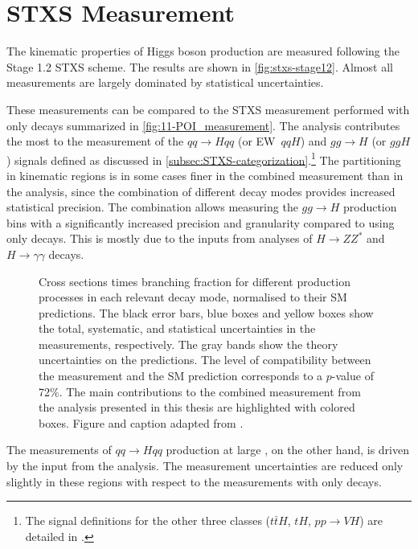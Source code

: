 \section{STXS Measurement}
The kinematic properties of Higgs boson production are measured following the Stage 1.2 STXS scheme. 
The results are shown in \cref{fig:stxs-stage12}. 
Almost all measurements are largely dominated by statistical uncertainties. 

These measurements can be compared to the STXS measurement performed with only \HWW decays summarized in \cref{fig:11-POI_measurement}. 
The \HWW analysis contributes the most to the measurement of the $qq\to Hqq$ (or EW~$qqH$) and $gg \to H$ (or $ggH$) signals defined as discussed in \cref{subsec:STXS-categorization}.\footnote{The signal definitions for the other three classes ($t\bar{t}H$, $tH$, $pp\to VH$) are detailed in .}
The partitioning in kinematic regions is in some cases finer in the combined measurement than in the \HWW analysis, since the combination of different decay modes provides increased statistical precision.
The combination allows measuring the $gg \to H$ production bins with a significantly increased precision and granularity compared to using only \HWW decays. 
This is mostly due to the inputs from analyses of $H \to ZZ^*$ and $H \to \gamma\gamma$ decays.
\begin{figure}[h!]
  \caption[Higgs boson cross sections times branching fraction for different production processes in each relevant decay mode.]{Cross sections times branching fraction for different production processes in each relevant decay mode, normalised to their SM predictions. The black error bars, blue boxes and yellow boxes show the total, systematic, and statistical uncertainties in the measurements, respectively. The gray bands show the theory uncertainties on the predictions. The level of compatibility between the measurement and the SM prediction corresponds to a $p$-value of 72\%. 
  The main contributions to the combined measurement from the \HWW analysis presented in this thesis are highlighted with colored boxes. 
  Figure and caption adapted from .}
  \label{fig:prod-per-channel}
\end{figure}
The measurements of $qq\to Hqq$ production at large \mjj, on the other hand, is driven by the input from the \HWW analysis. The measurement uncertainties are reduced only slightly in these regions with respect to the measurements with only \HWW decays.

